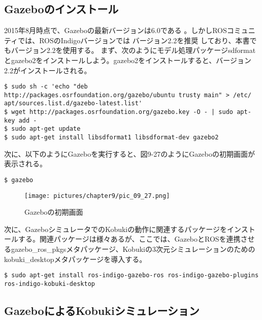\subsection{Gazeboのインストール}

2015年8月時点で、Gazeboの最新バージョンは6.0である  。しかしROSコミュニティでは、ROSのIndigoバージョンでは  バージョン2.2を推奨  しており、本書でもバージョン2.2を使用する。
まず、次のようにモデル処理パッケージsdformatとgazebo2をインストールしよう。gazebo2をインストールすると、バージョン2.2がインストールされる。

\begin{lstlisting}[language=ROS]
$ sudo sh -c 'echo "deb http://packages.osrfoundation.org/gazebo/ubuntu trusty main" > /etc/ apt/sources.list.d/gazebo-latest.list'
$ wget http://packages.osrfoundation.org/gazebo.key -O - | sudo apt-key add -
$ sudo apt-get update
$ sudo apt-get install libsdformat1 libsdformat-dev gazebo2
\end{lstlisting}

次に、以下のようにGazeboを実行すると、図9-27のようにGazeboの初期画面が表示される。

\begin{lstlisting}[language=ROS]
$ gazebo
\end{lstlisting}

\begin{figure}[htp]
  \centering
  \texttt{[image: pictures/chapter9/pic\_09\_27.png]}
  \caption{Gazeboの初期画面}
\end{figure}

次に、GazeboシミュレータでのKobukiの動作に関連するパッケージをインストールする。関連パッケージは様々あるが、ここでは、GazeboとROSを連携させるgazebo\_ros\_pkgsメタパッケージ、Kobukiの3次元シミュレーションのためのkobuki\_desktopメタパッケージを導入する。

\begin{lstlisting}[language=ROS]
$ sudo apt-get install ros-indigo-gazebo-ros ros-indigo-gazebo-plugins ros-indigo-kobuki-desktop
\end{lstlisting}

\subsection{GazeboによるKobukiシミュレーション}

